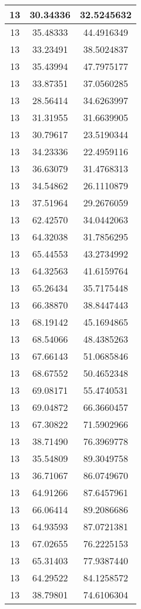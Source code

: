 \documentclass[
]{book}
\begin{document}
\begin{tabular}{c|c|c}
\hline
13 & 30.34336 & 32.5245632\\
\hline
13 & 35.48333 & 44.4916349\\
\hline
13 & 33.23491 & 38.5024837\\
\hline
13 & 35.43994 & 47.7975177\\
\hline
13 & 33.87351 & 37.0560285\\
\hline
13 & 28.56414 & 34.6263997\\
\hline
13 & 31.31955 & 31.6639905\\
\hline
13 & 30.79617 & 23.5190344\\
\hline
13 & 34.23336 & 22.4959116\\
\hline
13 & 36.63079 & 31.4768313\\
\hline
13 & 34.54862 & 26.1110879\\
\hline
13 & 37.51964 & 29.2676059\\
\hline
13 & 62.42570 & 34.0442063\\
\hline
13 & 64.32038 & 31.7856295\\
\hline
13 & 65.44553 & 43.2734992\\
\hline
13 & 64.32563 & 41.6159764\\
\hline
13 & 65.26434 & 35.7175448\\
\hline
13 & 66.38870 & 38.8447443\\
\hline
13 & 68.19142 & 45.1694865\\
\hline
13 & 68.54066 & 48.4385263\\
\hline
13 & 67.66143 & 51.0685846\\
\hline
13 & 68.67552 & 50.4652348\\
\hline
13 & 69.08171 & 55.4740531\\
\hline
13 & 69.04872 & 66.3660457\\
\hline
13 & 67.30822 & 71.5902966\\
\hline
13 & 38.71490 & 76.3969778\\
\hline
13 & 35.54809 & 89.3049758\\
\hline
13 & 36.71067 & 86.0749670\\
\hline
13 & 64.91266 & 87.6457961\\
\hline
13 & 66.06414 & 89.2086686\\
\hline
13 & 64.93593 & 87.0721381\\
\hline
13 & 67.02655 & 76.2225153\\
\hline
13 & 65.31403 & 77.9387440\\
\hline
13 & 64.29522 & 84.1258572\\
\hline
13 & 38.79801 & 74.6106304\\

\end{tabular}
\end{document}
